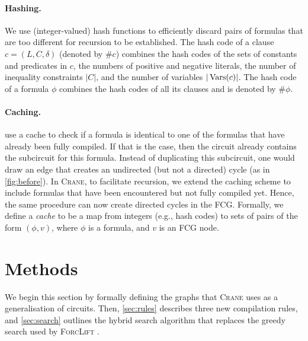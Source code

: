 \paragraph*{Hashing.}
We use (integer-valued) hash functions to efficiently discard pairs of formulas
that are too different for recursion to be established. The hash code of a
clause $c = (L, C, \delta)$ (denoted by $\# c$) combines the hash codes of the
sets of constants and predicates in $c$, the numbers of positive and negative
literals, the number of inequality constraints $|C|$, and the number of
variables $|\operatorname{Vars}(c)|$. The hash code of a formula $\phi$ combines the hash
codes of all its clauses and is denoted by $\#\phi$.

\paragraph*{Caching.}
\citet{DBLP:conf/ijcai/BroeckTMDR11} use a cache to check if a formula is
identical to one of the formulas that have already been fully compiled. If that
is the case, then the circuit already contains the subcircuit for this formula.
Instead of duplicating this subcircuit, one would draw an edge that creates an
undirected (but not a directed) cycle (as in \cref{fig:before}). In
\textsc{Crane}, to facilitate recursion, we extend the caching scheme to include
formulas that have been encountered but not fully compiled yet. Hence, the same
procedure can now create directed cycles in the FCG\@. Formally, we define a
\emph{cache} to be a map from integers (e.g., hash codes) to sets of pairs of
the form $(\phi, v)$, where $\phi$ is a formula, and $v$ is an FCG node.

\section{Methods}\label{sec:methods}

We begin this section by formally defining the graphs that \textsc{Crane} uses
as a generalisation of circuits. Then, \cref{sec:rules} describes three new
compilation rules, and \cref{sec:search} outlines the hybrid search algorithm
that replaces the greedy search used by \textsc{ForcLift}
\citep{DBLP:conf/ijcai/BroeckTMDR11}.

